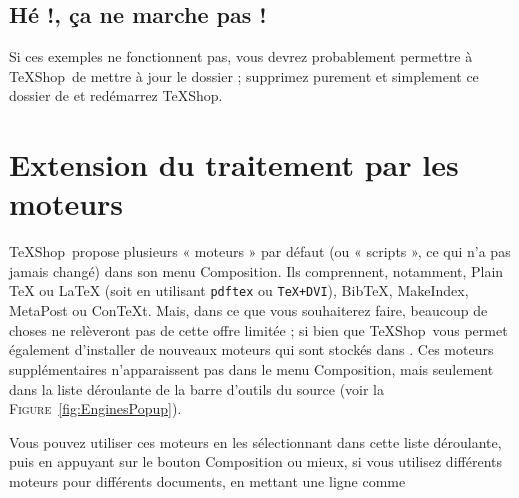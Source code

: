 \documentclass[11pt,french]{article}
\newcommand{\TS}{\textsf{\TeX Shop}}
\newcommand{\mnu}[1]{\textsf{#1}}
\newcommand{\selmark}{\colorbox{green}{\rule[-0.5ex]{0ex}{2.1ex}\texttt{•}}}
\begin{document}

\subsection{Hé !, ça ne marche pas !}

Si ces exemples ne fonctionnent pas, vous devrez probablement permettre à \TS\ de mettre à jour le dossier  ; supprimez purement et simplement ce dossier de  et redémarrez \TS.



\section{Extension du traitement par les moteurs}

\TS\ propose plusieurs « moteurs » par défaut (ou « scripts », ce qui n'a pas jamais changé) dans son menu \mnu{Composition}. Ils comprennent, notamment, \mnu{Plain TeX} ou \mnu{LaTeX} (soit en utilisant \texttt{pdftex} ou \texttt{TeX+DVI}), \mnu{BibTeX}, \mnu{MakeIndex}, \mnu{MetaPost} ou \mnu{ConTeXt}. Mais, dans ce que vous souhaiterez faire, beaucoup de choses ne relèveront pas de cette offre limitée ; si bien que \TS\ vous permet également d'installer de nouveaux moteurs qui sont stockés dans . Ces moteurs supplémentaires n'apparaissent pas dans le menu \mnu{Composition}, mais seulement dans la liste déroulante de la barre d'outils du source (voir la \textsc{Figure}~\ref{fig:EnginesPopup}).

Vous pouvez utiliser ces moteurs en les sélectionnant dans cette liste déroulante, puis en appuyant sur le bouton \mnu{Composition} ou mieux, si vous utilisez différents moteurs pour différents documents, en mettant une ligne comme
\end{document}
